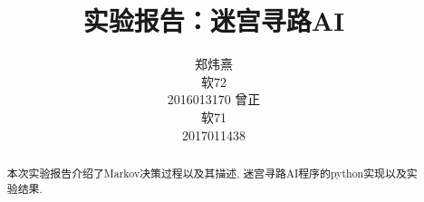 \documentclass{acm_proc_article-sp}
\begin{document}
\title{实验报告：迷宫寻路AI}
%
%
%
%
%

%
\author{
%
%
\alignauthor
郑炜熹 \\
软72 \\
2016013170 
\alignauthor
曾正 \\
软71 \\
2017011438
}


\maketitle
\begin{abstract}
本次实验报告介绍了Markov决策过程以及其描述, 迷宫寻路AI程序的python实现以及实验结果.
\end{abstract}
\end{document}
